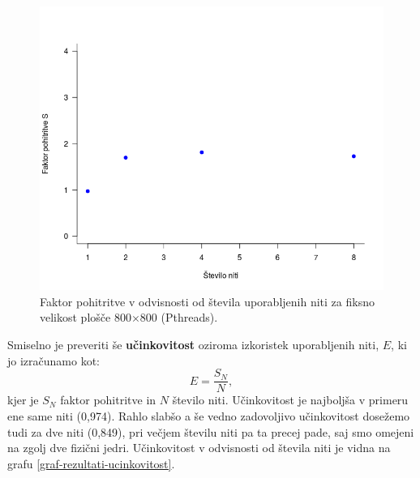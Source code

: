 \documentclass[a4paper,titlepage,11pt]{article}
\begin{document}
\begin{figure}[H]
\begin{center}
\includegraphics[scale=0.5]{graf-rezultati-2_2.png}
\caption{Faktor pohitritve v odvisnosti od števila uporabljenih niti za fiksno velikost plošče 800$\times$800 (Pthreads).}
\label{graf-rezultati-pohitritev}
\end{center}
\vspace{-25pt}
\end{figure}

Smiselno je preveriti še \textbf{učinkovitost} oziroma izkoristek uporabljenih niti, $E$, ki jo izračunamo kot:
\begin{equation}
E = \frac{S_N}{N},
\end{equation}
kjer je $S_N$ faktor pohitritve in $N$ število niti. Učinkovitost je najboljša v primeru ene same niti (0,974). Rahlo slabšo a še vedno zadovoljivo učinkovitost dosežemo tudi za dve niti (0,849), pri večjem številu niti pa ta precej pade, saj smo omejeni na zgolj dve fizični jedri. Učinkovitost v odvisnosti od števila niti je vidna na grafu \ref{graf-rezultati-ucinkovitost}.
\end{document}
